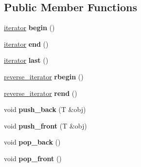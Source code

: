 \subsection*{Public Member Functions}
\begin{DoxyCompactItemize}
\item 
\hypertarget{structIntrusiveList_a336cc31d72aa71a54ae03d0041bed225}{}\hyperlink{structIntrusiveList_1_1iterator}{iterator} {\bfseries begin} ()\label{structIntrusiveList_a336cc31d72aa71a54ae03d0041bed225}

\item 
\hypertarget{structIntrusiveList_afa4b078624ef59abf461fb0985bfa840}{}\hyperlink{structIntrusiveList_1_1iterator}{iterator} {\bfseries end} ()\label{structIntrusiveList_afa4b078624ef59abf461fb0985bfa840}

\item 
\hypertarget{structIntrusiveList_a0c0857a3e1a7fb32b4ce36ad25a49b6f}{}\hyperlink{structIntrusiveList_1_1iterator}{iterator} {\bfseries last} ()\label{structIntrusiveList_a0c0857a3e1a7fb32b4ce36ad25a49b6f}

\item 
\hypertarget{structIntrusiveList_aa3c78a96b6ee696d5e7ae4e917d13793}{}\hyperlink{structIntrusiveList_1_1reverse__iterator}{reverse\+\_\+iterator} {\bfseries rbegin} ()\label{structIntrusiveList_aa3c78a96b6ee696d5e7ae4e917d13793}

\item 
\hypertarget{structIntrusiveList_ab065d0b937dc9cc61a7d2fad9145bb4b}{}\hyperlink{structIntrusiveList_1_1reverse__iterator}{reverse\+\_\+iterator} {\bfseries rend} ()\label{structIntrusiveList_ab065d0b937dc9cc61a7d2fad9145bb4b}

\item 
\hypertarget{structIntrusiveList_a4ce874e13f50d78ef3938a131a0d2e07}{}void {\bfseries push\+\_\+back} (T \&obj)\label{structIntrusiveList_a4ce874e13f50d78ef3938a131a0d2e07}

\item 
\hypertarget{structIntrusiveList_a04263b1edddb7540730265e37df2d1e7}{}void {\bfseries push\+\_\+front} (T \&obj)\label{structIntrusiveList_a04263b1edddb7540730265e37df2d1e7}

\item 
\hypertarget{structIntrusiveList_aba2254407f426a97c33d2b12ee89c76d}{}void {\bfseries pop\+\_\+back} ()\label{structIntrusiveList_aba2254407f426a97c33d2b12ee89c76d}

\item 
\hypertarget{structIntrusiveList_a179fb596c43dbfaed05c29ec00742684}{}void {\bfseries pop\+\_\+front} ()\label{structIntrusiveList_a179fb596c43dbfaed05c29ec00742684}


\end{DoxyCompactItemize}
